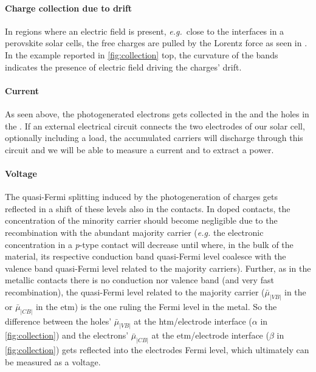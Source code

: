 		\paragraph{Charge collection due to drift}
		In regions where an electric field is present, \textsl{e.g.}\ close to the interfaces in a perovskite solar cells, the free charges are pulled by the Lorentz force as seen in .
		In the example reported in \cref{fig:collection} top, the curvature of the bands indicates the presence of electric field driving the charges' drift.

		\paragraph{Current}
		As seen above, the photogenerated electrons gets collected in the  and the holes in the .
		If an external electrical circuit connects the two electrodes of our solar cell, optionally including a load, the accumulated carriers will discharge through this circuit and we will be able to measure a current and to extract a power.

		\paragraph{Voltage}
		The quasi-Fermi splitting induced by the photogeneration of charges gets reflected in a shift of these levels also in the contacts.
		In doped contacts, the concentration of the minority carrier should become negligible due to the recombination with the abundant majority carrier (\textsl{e.g.} the electronic concentration in a \textit{p}-type contact will decrease until where, in the bulk of the material, its respective conduction band quasi-Fermi level coalesce with the valence band quasi-Fermi level related to the majority carriers).
		Further, as in the metallic contacts there is no conduction nor valence band (and very fast recombination), the quasi\hyp{}Fermi level related to the majority carrier ($\bar\mu_|VB|$ in the  or $\bar\mu_|CB|$ in the \gls{etm}) is the one ruling the Fermi level in the metal.
		So the difference between the holes' $\bar\mu_|VB|$ at the \gls{htm}/electrode interface ($\alpha$ in \cref{fig:collection}) and the electrons' $\bar\mu_|CB|$ at the \gls{etm}/electrode interface ($\beta$ in \cref{fig:collection}) gets reflected into the electrodes Fermi level, which ultimately can be measured as a voltage.


